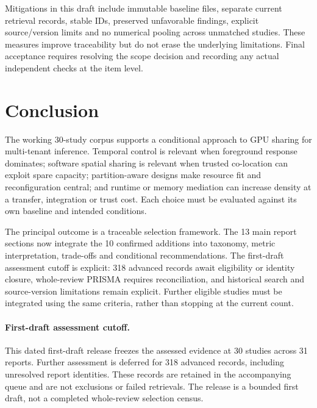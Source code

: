 Mitigations in this draft include immutable baseline files, separate current retrieval records, stable IDs, preserved unfavorable findings, explicit source/version limits and no numerical pooling across unmatched studies. These measures improve traceability but do not erase the underlying limitations. Final acceptance requires resolving the scope decision and recording any actual independent checks at the item level.

\section{Conclusion}
The working 30-study corpus supports a conditional approach to GPU sharing for multi-tenant inference. Temporal control is relevant when foreground response dominates; software spatial sharing is relevant when trusted co-location can exploit spare capacity; partition-aware designs make resource fit and reconfiguration central; and runtime or memory mediation can increase density at a transfer, integration or trust cost. Each choice must be evaluated against its own baseline and intended conditions.

The principal outcome is a traceable selection framework. The 13 main report sections now integrate the 10 confirmed additions into taxonomy, metric interpretation, trade-offs and conditional recommendations. The first-draft assessment cutoff is explicit: 318 advanced records await eligibility or identity closure, whole-review PRISMA requires reconciliation, and historical search and source-version limitations remain explicit. Further eligible studies must be integrated using the same criteria, rather than stopping at the current count.

\paragraph{First-draft assessment cutoff.} This dated first-draft release freezes the assessed evidence at 30 studies across 31 reports. Further assessment is deferred for 318 advanced records, including unresolved report identities. These records are retained in the accompanying queue and are not exclusions or failed retrievals. The release is a bounded first draft, not a completed whole-review selection census.
